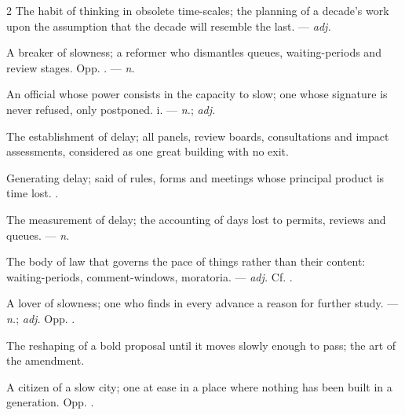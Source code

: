 \begin{multicols}{2}
 The habit of thinking in obsolete time-scales; the planning of a decade's work upon the assumption that the decade will resemble the last. —  \textit{adj.}

 A breaker of slowness; a reformer who dismantles queues, waiting-periods and review stages. Opp. . —  \textit{n.}

 An official whose power consists in the capacity to slow; one whose signature is never refused, only postponed.   i. —  \textit{n.};  \textit{adj.}

  The establishment of delay; all panels, review boards, consultations and impact assessments, considered as one great building with no exit.

 Generating delay; said of rules, forms and meetings whose principal product is time lost. .

 The measurement of delay; the accounting of days lost to permits, reviews and queues. —  \textit{n.}

 The body of law that governs the pace of things rather than their content: waiting-periods, comment-windows, moratoria. —  \textit{adj.} Cf. .

 A lover of slowness; one who finds in every advance a reason for further study. —  \textit{n.};  \textit{adj.} Opp. .

 The reshaping of a bold proposal until it moves slowly enough to pass; the art of the amendment.  

 A citizen of a slow city; one at ease in a place where nothing has been built in a generation. Opp. .


\end{multicols}
